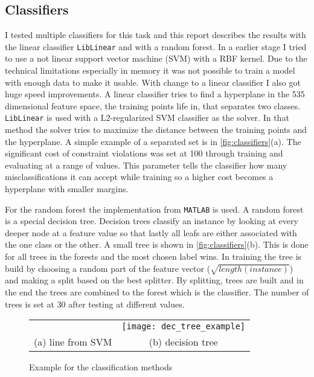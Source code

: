 \subsection{Classifiers} %
\label{sub:classifiers}
I tested multiple classifiers for this task and this report describes the results with the linear classifier \texttt{LibLinear}\cite{liblinear} and with a random forest\cite{randforest}.
In a earlier stage I tried to use a not linear support vector machine (SVM) with a RBF kernel. Due to the technical limitations especially in memory it was not possible to train a model with enough data to make it usable. With change to a linear classifier I also got huge speed improvements. A linear classifier tries to find a hyperplane in the 535 dimensional feature space, the training points life in, that separates two classes. \texttt{LibLinear} is used with a L2-regularized SVM classifier as the solver. In that method the solver tries to maximize the distance between the training points and the hyperplane. A simple example of a separated set is in \autoref{fig:classifiers}(a). The significant cost of constraint violations was set at 100 through training and evaluating at a range of values. This parameter tells the classifier how many misclassifications it can accept while training so a higher cost becomes a hyperplane with smaller margins.

For the random forest the implementation from \texttt{MATLAB} is used. A random forest is a special decision tree. Decision trees classify an instance by looking at every deeper node at a feature value so that lastly all leafs are either associated with the one class or the other. A small tree is shown in \autoref{fig:classifiers}(b). This is done for all trees in the forests and the most chosen label wins. In training the tree is build by choosing a random part of the feature vector ($\sqrt{length(instance)}$) and making a split based on the best splitter. By splitting, trees are built and in the end the trees are combined to the forest which is the classifier. The number of trees is set at 30 after testing at different values.
\begin{figure}
	\centering
	\footnotesize
	\begin{tabular}{c c}
		\raisebox{-.18\height}{\texttt{[image: svm\_example]}} &
		\texttt{[image: dec\_tree\_example]} \\
		(a) line from SVM & (b) decision tree
	\end{tabular}
	\caption{Example for the classification methods}
	\label{fig:classifiers}
\end{figure}

